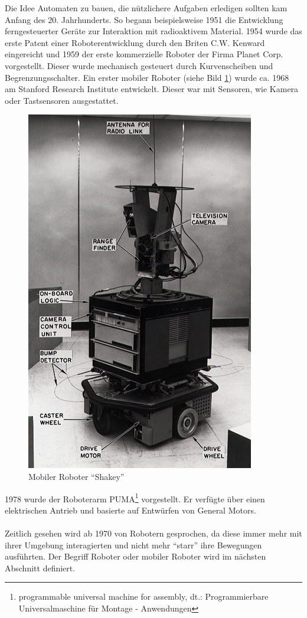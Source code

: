 Die Idee Automaten zu bauen, die nützlichere Aufgaben erledigen sollten kam Anfang des 20. Jahrhunderts. So begann beispielsweise 1951 die Entwicklung ferngesteuerter Geräte zur Interaktion mit radioaktivem Material. 1954 wurde das erste Patent einer Roboterentwicklung durch den Briten C.W. Kenward eingereicht und 1959 der erste kommerzielle Roboter der Firma Planet Corp. vorgestellt. Dieser wurde mechanisch gesteuert durch Kurvenscheiben und Begrenzungsschalter. Ein erster mobiler Roboter (siehe Bild \ref{f:shakey}) wurde ca. 1968 am Stanford Research Institute entwickelt. Dieser war mit Sensoren, wie Kamera oder Tastsensoren ausgestattet.
\begin{figure}[H]						
	\centering							
	\includegraphics[scale=1]{Bilder/shakey.jpg}			
	\caption{Mobiler Roboter "`Shakey"'}						
	\label{f:shakey}						
\end{figure}
1978 wurde der Roboterarm PUMA\footnote{programmable universal machine for assembly, dt.: Programmierbare Universalmaschine für Montage - Anwendungen} vorgestellt. Er verfügte über einen elektrischen Antrieb und basierte auf Entwürfen von General Motors.
\\
\\
Zeitlich gesehen wird ab 1970 von Robotern gesprochen, da diese immer mehr mit ihrer Umgebung interagierten und nicht mehr "`starr"' ihre Bewegungen ausführten. Der Begriff Roboter oder mobiler Roboter wird im nächsten Abschnitt definiert.
 
